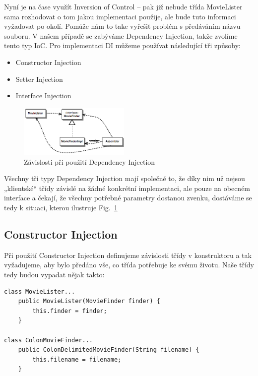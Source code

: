 \documentclass[a4paper,conference]{IEEEtran}
\newcommand{\fig}[1]{Fig.~\ref{fig:#1}}      %
\begin{document}
Nyní je na čase využít Inversion of Control – pak již nebude třída MovieLister sama rozhodovat o tom jakou implementaci použije, ale bude tuto informaci vyžadovat po okolí. Pomůže nám to take vyřešit problém s předáváním názvu souboru. V našem případě se zabýváme Dependency Injection, takže zvolíme tento typ IoC. Pro implementaci DI můžeme používat následující tři způsoby:

\begin{itemize}
\item{Constructor Injection} 
\item{Setter Injection} 
\item{Interface Injection} 
\end{itemize}

\begin{figure}[!t]
\centering
\includegraphics[width=2.1in]{2-Injector}
\caption{Závislosti při použití Dependency Injection}
\label{fig:injector}
\end{figure}

Všechny tři typy Dependency Injection mají společné to, že díky nim už nejsou „klientské“ třídy závislé na žádné konkrétní implementaci, ale pouze na obecném interface a čekají, že všechny potřebné parametry dostanou zvenku, dostáváme se tedy k situaci, kterou ilustruje \fig{injector}

\subsection{Constructor Injection}

Při použití Constructor Injection definujeme závislosti třídy v konstruktoru a tak vyžadujeme, aby bylo předáno vše, co třída potřebuje ke svému životu. Naše třídy tedy budou vypadat nějak takto:

\lstset{language=Java, caption=MovieLister s použitím Constructor Injection, label=listing:Java}
\begin{lstlisting}
class MovieLister...
    public MovieLister(MovieFinder finder) {
        this.finder = finder;       
    }

class ColonMovieFinder...
    public ColonDelimitedMovieFinder(String filename) {
        this.filename = filename;
    }
\end{lstlisting}
\end{document}
